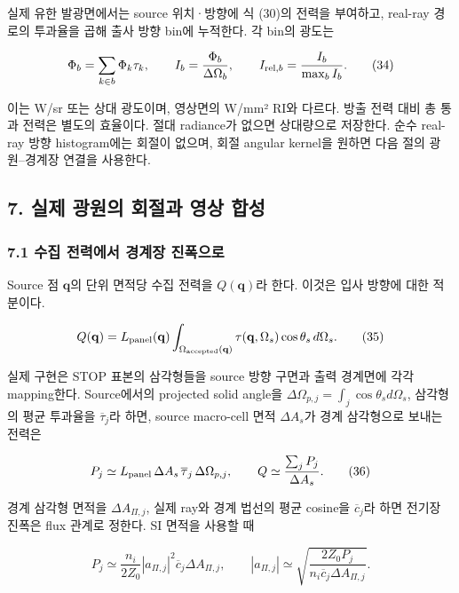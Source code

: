 \documentclass[
  a4paper,
]{article}
\begin{document}
실제 유한 발광면에서는 source 위치·방향에 식 (30)의 전력을 부여하고,
real-ray 경로의 투과율을 곱해 출사 방향 bin에 누적한다. 각 bin의 광도는

\[
\Phi_b=\sum_{k\in b}\Phi_k\tau_k,\qquad
I_b=\frac{\Phi_b}{\Delta\Omega_b},\qquad
I_{{\rm rel},b}=\frac{I_b}{\max_b I_b}.
\tag{34}
\]

이는 W/sr 또는 상대 광도이며, 영상면의 W/mm² RI와 다르다. 방출 전력 대비
총 통과 전력은 별도의 효율이다. 절대 radiance가 없으면 상대량으로
저장한다. 순수 real-ray 방향 histogram에는 회절이 없으며, 회절 angular
kernel을 원하면 다음 절의 광원--경계장 연결을 사용한다.

\hypertarget{uxc2e4uxc81c-uxad11uxc6d0uxc758-uxd68cuxc808uxacfc-uxc601uxc0c1-uxd569uxc131}{%
\subsection{7. 실제 광원의 회절과 영상
합성}\label{uxc2e4uxc81c-uxad11uxc6d0uxc758-uxd68cuxc808uxacfc-uxc601uxc0c1-uxd569uxc131}}

\hypertarget{uxc218uxc9d1-uxc804uxb825uxc5d0uxc11c-uxacbduxacc4uxc7a5-uxc9c4uxd3eduxc73cuxb85c}{%
\subsubsection{7.1 수집 전력에서 경계장
진폭으로}\label{uxc218uxc9d1-uxc804uxb825uxc5d0uxc11c-uxacbduxacc4uxc7a5-uxc9c4uxd3eduxc73cuxb85c}}

Source 점 \(\mathbf q\)의 단위 면적당 수집 전력을 \(Q(\mathbf q)\)라
한다. 이것은 입사 방향에 대한 적분이다.

\[
Q(\mathbf q)=L_{\rm panel}(\mathbf q)
 \int_{\Omega_{\rm accepted}(\mathbf q)}\tau(\mathbf q,\Omega_s)
 \cos\theta_s\,d\Omega_s.
\tag{35}
\]

실제 구현은 STOP 표본의 삼각형들을 source 방향 구면과 출력 경계면에 각각
mapping한다. Source에서의 projected solid angle을
\(\Delta\Omega_{p,j}=\int_j\cos\theta_s d\Omega_s\), 삼각형의 평균
투과율을 \(\overline\tau_j\)라 하면, source macro-cell 면적
\(\Delta A_s\)가 경계 삼각형으로 보내는 전력은

\[
P_j\simeq L_{\rm panel}\,\Delta A_s\,
 \overline\tau_j\,\Delta\Omega_{p,j},\qquad
Q\simeq\frac{\sum_jP_j}{\Delta A_s}.
\tag{36}
\]

경계 삼각형 면적을 \(\Delta A_{\Pi,j}\), 실제 ray와 경계 법선의 평균
cosine을 \(\overline c_j\)라 하면 전기장 진폭은 flux 관계로 정한다. SI
면적을 사용할 때

\[
P_j\simeq\frac{n_i}{2Z_0}|a_{\Pi,j}|^2\overline c_j\Delta A_{\Pi,j},
\qquad
|a_{\Pi,j}|\simeq
 \sqrt{\frac{2Z_0P_j}{n_i\overline c_j\Delta A_{\Pi,j}}}.
\tag{37}
\]
\end{document}
